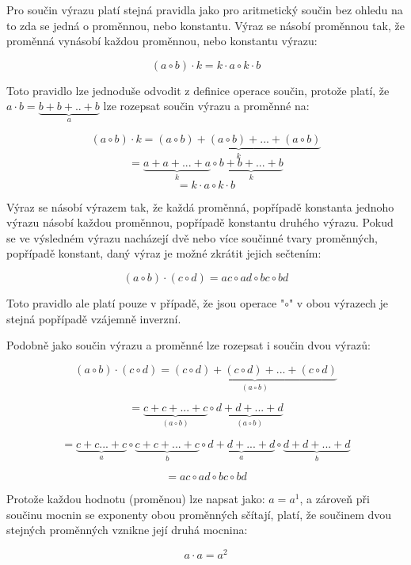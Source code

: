 
Pro součin výrazu platí stejná pravidla jako pro aritmetický součin bez ohledu na to zda se jedná o proměnnou, nebo konstantu. Výraz se násobí proměnnou tak, že proměnná vynásobí každou proměnnou, nebo konstantu výrazu:

$$ (a \circ b) \cdot k = k\cdot a \circ k \cdot b  $$

Toto pravidlo lze jednoduše odvodit z definice operace součin, protože platí, že $a \cdot b = \underbrace{b + b +.. +b}_a$ lze rozepsat součin výrazu a proměnné na:

$$ (a \circ b ) \cdot k = \underbrace{(a \circ b ) + (a \circ b ) +...+ (a \circ b )}_k$$
$$=\underbrace{a + a + ... +a}_k \circ \underbrace{b + b +...+b}_k$$
$$ = k\cdot a \circ k\cdot b $$


Výraz se násobí výrazem tak, že každá proměnná, popřípadě konstanta jednoho výrazu násobí každou proměnnou, popřípadě konstantu druhého výrazu. Pokud se ve výsledném výrazu nacházejí dvě nebo více součinné tvary proměnných, popřípadě konstant, daný výraz je možné zkrátit jejich sečtením:

$$ (a \circ b) \cdot (c \circ d) = ac \circ ad \circ bc \circ bd $$

Toto pravidlo ale platí pouze v případě, že jsou operace "$\circ$" v obou výrazech je stejná popřípadě vzájemně inverzní.

Podobně jako součin výrazu a proměnné lze rozepsat i součin dvou výrazů:

$$(a \circ b) \cdot (c \circ d) = \underbrace{(c \circ d) + (c \circ d) + ... + (c \circ d)}_{(a \circ b)} $$

$$ = \underbrace{c + c + ...+c}_{(a \circ b)} \circ \underbrace{d + d + ... +d }_{(a \circ b)} $$

$$ = \underbrace{c + c ... +c}_{a} \circ \underbrace{c + c + ... +c}_{b} \circ \underbrace{d + d + ... +d}_{a} \circ \underbrace{d+d+...+d}_b $$

$$ = ac \circ ad \circ bc \circ bd $$

Protože každou hodnotu (proměnou) lze napsat jako: $a = a^1$, a zároveň při součinu mocnin se exponenty obou proměnných sčítají, platí, že součinem dvou stejných proměnných vznikne její druhá mocnina:

$$ a\cdot a = a^2 $$


